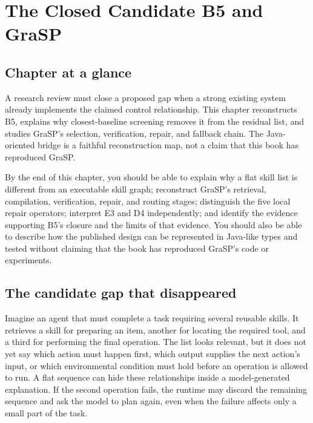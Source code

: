 \chapter{The Closed Candidate B5 and GraSP}
\label{ch:closed-b5-grasp}

\section*{Chapter at a glance}
{}

A research review must close a proposed gap when a strong existing system already implements the claimed control relationship. This chapter reconstructs B5, explains why closest-baseline screening removes it from the residual list, and studies GraSP's selection, verification, repair, and fallback chain. The Java-oriented bridge is a faithful reconstruction map, not a claim that this book has reproduced GraSP.

\begin{learningbox}
By the end of this chapter, you should be able to explain why a flat skill list is different from an executable skill graph; reconstruct GraSP's retrieval, compilation, verification, repair, and routing stages; distinguish the five local repair operators; interpret E3 and D4 independently; and identify the evidence supporting B5's closure and the limits of that evidence. You should also be able to describe how the published design can be represented in Java-like types and tested without claiming that the book has reproduced GraSP's code or experiments.
\end{learningbox}

\section{The candidate gap that disappeared}
\label{sec:ch17-gap-disappeared}

Imagine an agent that must complete a task requiring several reusable \glspl{skill}. It retrieves a skill for preparing an item, another for locating the required tool, and a third for performing the final operation. The list looks relevant, but it does not yet say which action must happen first, which output supplies the next action's input, or which environmental condition must hold before an operation is allowed to run. A flat sequence can hide these relationships inside a model-generated explanation. If the second operation fails, the runtime may discard the remaining sequence and ask the model to plan again, even when the failure affects only a small part of the task.

